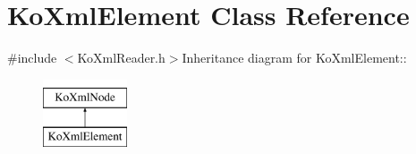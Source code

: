 \hypertarget{classKoXmlElement}{
\section{KoXmlElement Class Reference}
\label{classKoXmlElement}
}


{\ttfamily \#include $<$KoXmlReader.h$>$}Inheritance diagram for KoXmlElement::\begin{figure}[H]
\begin{center}
\leavevmode
\includegraphics[height=2cm]{classKoXmlElement}
\end{center}
\end{figure}
